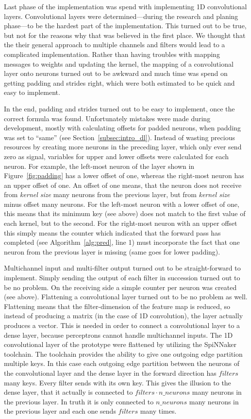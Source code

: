 \documentclass[]{article}
\begin{document}
Last phase of the implementation was spend with implementing 1D
convolutional layers.
Convolutional layers were determined---during the research and planing
phase---to be the hardest part of the implementation.
This turned out to be true, but not for the reasons why that was
believed in the first place.
We thought that the their general approach to multiple channels and
filters would lead to a complicated implementation.
Rather than having troubles with mapping messages to weights and
updating the kernel, the mapping of a convolutional layer onto neurons
turned out to be awkward and much time was spend on getting padding
and strides right, which were both estimated to be quick and easy to
implement.

In the end, padding and strides turned out to be easy to implement,
once the correct formula was found.
Unfortunately mistakes were made during development, mostly with
calculating offsets for padded neurons, when padding was set to
``same'' (see Section~\ref{subsec:intro_dl}).
Instead of wasting precious resources by creating more neurons in
the preceding layer, which only ever send zero as signal, variables
for upper and lower offsets were calculated for each neuron.
For example, the left-most neuron of the layer shown in
Figure~\ref{fig:padding} has a lower offset of one, whereas the
right-most neuron has an upper offset of one.
An offset of one means, that the neuron does not receive
from \textit{kernel size} many neurons from the previous layer, but
from \textit{kernel size} minus offset many neurons.
For the left-most neuron with a lower offset of one, this means that
its minimum key (see above) does not match to the first
value of each kernel, but to the second.
For the right-most neuron with an upper offset this simply means the
counter which indicated that the forward pass has completed
(see Algorithm~\ref{alg:pred}, line 1) must incorporate the fact
that one neuron from the previous layer is missing (same goes for
lower padding).

Multichannel input and multi-filter output turned out to be
straight-forward to implement.
Simply sending the output of each filter in succession turned out to
be no problem.
On the receiving side a simple counter per neuron was created
(see above).
Flattening a convolutional layer turned out to be no problem as well.
Flattening means that the filter-dimension of the feature map is
reduced, so instead of producing a matrix (in the case of 1D
convolution), the layer actually produces a vector.
This is needed in order to connect a convolutional layer to a dense
layer, because perceptrons cannot handle multichannel inputs.
The 1D convolutional layer of the prototype were flattened by
utilizing the SpiNNaker toolchain.
The toolchain provides the ability to give one outgoing edge partition
multiple keys.
In this case each outgoing edge partition between the neurons of the
convolutional layer and the dense layer in the forward direction has
$filters$ many keys.
Every filter sends with its own key.
This gives the illusion to the dense layer, that it actually is
connected to $filters \cdot n\_neurons$ many neurons in the previous
layer.
In truth it is only connected to $n\_neurons$ many neurons in the
previous layer and each one sends $filters$ many times.
\end{document}
